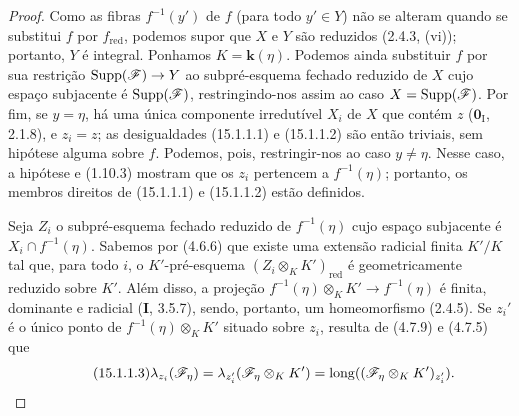 \begin{proof}
Como as fibras $f^{-1}(y')$ de $f$ (para todo $y'\in Y$) não se alteram quando se substitui $f$ por $f_{\mathrm{red}}$, podemos supor que $X$ e $Y$ são reduzidos (2.4.3, (vi)); portanto, $Y$ é integral. Ponhamos $K=\mathbf{k}(\eta)$. Podemos ainda substituir $f$ por sua restrição $\operatorname{Supp}(\sh{F})\to Y$ ao subpré-esquema fechado reduzido de $X$ cujo espaço subjacente é $\operatorname{Supp}(\mathscr{F})$, restringindo-nos assim ao caso $X=\operatorname{Supp}(\mathscr{F})$. Por fim, se $y=\eta$, há uma única componente irredutível $X_i$ de $X$ que contém $z$ ($\mathbf{0}_{\mathrm I}$, 2.1.8), e $z_i=z$; as desigualdades (15.1.1.1) e (15.1.1.2) são então triviais, sem hipótese alguma sobre $f$. Podemos, pois, restringir-nos ao caso $y\ne\eta$. Nesse caso, a hipótese e (1.10.3) mostram que os $z_i$ pertencem a $f^{-1}(\eta)$; portanto, os membros direitos de (15.1.1.1) e (15.1.1.2) estão definidos.

Seja $Z_i$ o subpré-esquema fechado reduzido de $f^{-1}(\eta)$ cujo espaço subjacente é $X_i\cap f^{-1}(\eta)$. Sabemos por (4.6.6) que existe uma extensão radicial finita $K'/K$ tal que, para todo $i$, o $K'$-pré-esquema $(Z_i\otimes_K K')_{\mathrm{red}}$ é geometricamente reduzido sobre $K'$. Além disso, a projeção $f^{-1}(\eta)\otimes_K K'\to f^{-1}(\eta)$ é finita, dominante e radicial ($\textbf{I}$, 3.5.7), sendo, portanto, um homeomorfismo (2.4.5). Se $z_i'$ é o único ponto de $f^{-1}(\eta)\otimes_K K'$ situado sobre $z_i$, resulta de (4.7.9) e (4.7.5) que
\[
\tag{15.1.1.3}
\label{IV.15.1.1.3}
  \lambda_{z_i}(\sh{F}_\eta)
  =\lambda_{z_i'}(\sh{F}_\eta\otimes_K K')
  =\operatorname{long}((\sh{F}_\eta\otimes_K K')_{z_i'}).
\]


\end{proof}
